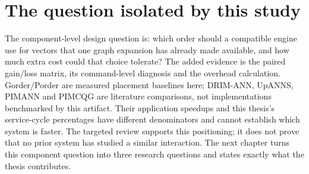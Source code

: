 \documentclass[11pt,a4paper]{report}
\begin{document}
\section{The question isolated by this study}
The component-level design question is: which order should a compatible engine use for vectors that one graph expansion has already made available, and how much extra cost could that choice tolerate? The added evidence is the paired gain/loss matrix, its command-level diagnosis and the overhead calculation. Gorder/Porder are measured placement baselines here; DRIM-ANN, UpANNS, PIMANN and PIMCQG are literature comparisons, not implementations benchmarked by this artifact. Their application speedups and this thesis's service-cycle percentages have different denominators and cannot establish which system is faster. The targeted review supports this positioning; it does not prove that no prior system has studied a similar interaction. The next chapter turns this component question into three research questions and states exactly what the thesis contributes.
\end{document}
